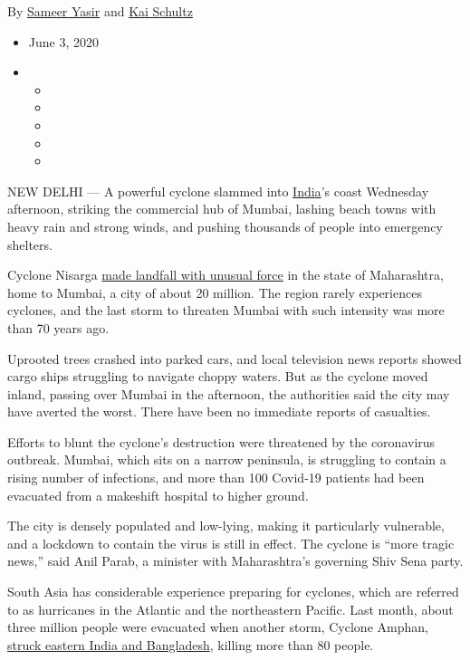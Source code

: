 By \href{https://www.nytimes3xbfgragh.onion/by/sameer-yasir}{Sameer
Yasir} and \href{https://www.nytimes3xbfgragh.onion/by/kai-schultz}{Kai
Schultz}

\begin{itemize}
\item
  June 3, 2020
\item
  \begin{itemize}
  \item
  \item
  \item
  \item
  \item
  \end{itemize}
\end{itemize}

NEW DELHI --- A powerful cyclone slammed into
\href{https://www.nytimes3xbfgragh.onion/2020/06/25/world/asia/india-monsoon-lightning-rainstorms.html}{India}'s
coast Wednesday afternoon, striking the commercial hub of Mumbai,
lashing beach towns with heavy rain and strong winds, and pushing
thousands of people into emergency shelters.

Cyclone Nisarga
\href{https://www.hindustantimes.com/india-news/cyclone-nisarga-closes-in-215km-from-mumbai-imd/story-tv1tkoMNdTPFluAGXy39oM.html}{made
landfall with unusual force} in the state of Maharashtra, home to
Mumbai, a city of about 20 million. The region rarely experiences
cyclones, and the last storm to threaten Mumbai with such intensity was
more than 70 years ago.

Uprooted trees crashed into parked cars, and local television news
reports showed cargo ships struggling to navigate choppy waters. But as
the cyclone moved inland, passing over Mumbai in the afternoon, the
authorities said the city may have averted the worst. There have been no
immediate reports of casualties.

Efforts to blunt the cyclone's destruction were threatened by the
coronavirus outbreak. Mumbai, which sits on a narrow peninsula, is
struggling to contain a rising number of infections, and more than 100
Covid-19 patients had been evacuated from a makeshift hospital to higher
ground.

The city is densely populated and low-lying, making it particularly
vulnerable, and a lockdown to contain the virus is still in effect. The
cyclone is ``more tragic news,'' said Anil Parab, a minister with
Maharashtra's governing Shiv Sena party.

South Asia has considerable experience preparing for cyclones, which are
referred to as hurricanes in the Atlantic and the northeastern Pacific.
Last month, about three million people were evacuated when another
storm, Cyclone Amphan,
\href{https://www.nytimes3xbfgragh.onion/2020/05/20/world/asia/cyclone-amphan-india-bangladesh.html}{struck
eastern India and Bangladesh}, killing more than 80 people.

